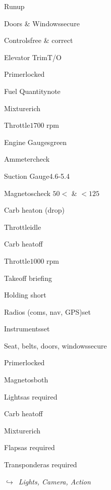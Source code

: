 \begin{multicols}{2}
\begin{checklist}{Runup}
    \item{Doors \& Windows}{secure}
    \item{Controls}{free \& correct}
    \item{Elevator Trim}{T/O}
    \item{Primer}{locked}
    \item{Fuel Quantity}{note}
    \item{Mixture}{rich}
    \item{Throttle}{$1700$ rpm}
    \item{Engine Gauges}{green}
    \item{Ammeter}{check}
    \item{Suction Gauge}{4.6-5.4}
    \item{Magnetos}{check $50<$ \& $<125$}
    \item{Carb heat}{on (drop)}
    \item{Throttle}{idle}
    \item{Carb heat}{off}
    \item{Throttle}{$1000$ rpm}
\end{checklist}

\begin{checklist}{Takeoff briefing}
\end{checklist}

\begin{checklist}{Holding short}
    \item{Radios (coms, nav, GPS)}{set}
    \item{Instruments}{set}
    \item{Seat, belts, doors, windows}{secure}
    \item{Primer}{locked}
    \item{Magnetos}{both}
    \item{Lights}{as required}
    \item{Carb heat}{off}
    \item{Mixture}{rich}
    \item{Flaps}{as required}
    \item{Transponder}{as required}
\end{checklist}

\noindent$\hookrightarrow$\ \textit{Lights, Camera, Action}

\end{multicols}

